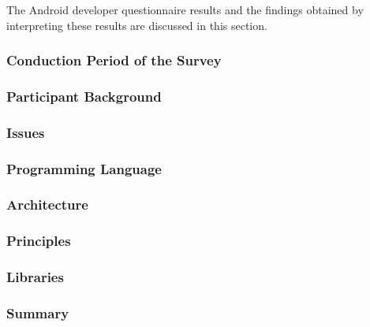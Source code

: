 The Android developer questionnaire results and the findings obtained by interpreting these results are discussed in this section.

\subsubsection{Conduction Period of the Survey}


\subsubsection{Participant Background}


\subsubsection{Issues}


\subsubsection{Programming Language}


\subsubsection{Architecture}


\subsubsection{Principles}


\subsubsection{Libraries}


\subsubsection{Summary}
